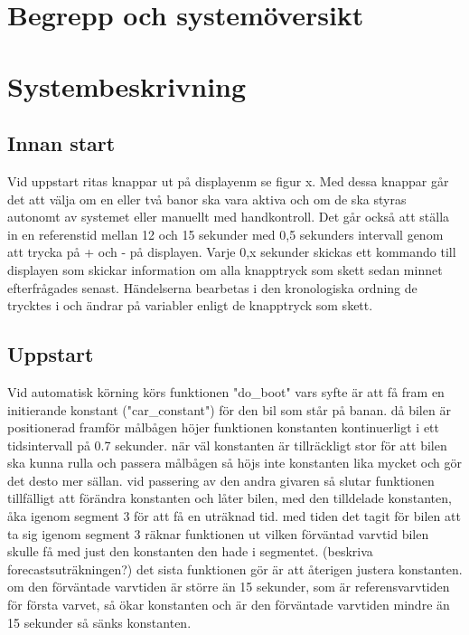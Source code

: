 \documentclass[10pt,oneside,swedish]{lips-no_customer}
\begin{document}
\section{Begrepp och systemöversikt}
\section{Systembeskrivning}

\subsection{Innan start}

Vid uppstart ritas knappar ut på displayenm se figur x. Med dessa knappar går
det att välja om en eller två banor ska vara aktiva och om de ska styras
autonomt av systemet eller manuellt med handkontroll. Det går också att ställa
in en referenstid mellan 12 och 15 sekunder med 0,5 sekunders intervall genom
att trycka på + och - på displayen. Varje 0,x sekunder skickas ett kommando till
displayen som skickar information om alla knapptryck som skett sedan minnet
efterfrågades senast. Händelserna bearbetas i den kronologiska ordning de
trycktes i och ändrar på variabler enligt de knapptryck som skett.

\subsection{Uppstart} 

Vid automatisk körning körs funktionen "do\_boot" vars syfte är att få fram en
initierande konstant ("car\_constant") för den bil som står på banan. då bilen är
positionerad framför målbågen höjer funktionen konstanten kontinuerligt i ett
tidsintervall på 0.7 sekunder. när väl konstanten är tillräckligt stor för att
bilen ska kunna rulla och passera målbågen så höjs inte konstanten lika mycket
och gör det desto mer sällan. vid passering av den andra givaren så slutar
funktionen tillfälligt att förändra konstanten och låter bilen, med den
tilldelade konstanten, åka igenom segment 3 för att få en uträknad tid. med
tiden det tagit för bilen att ta sig igenom segment 3 räknar funktionen ut
vilken förväntad varvtid bilen skulle få med just den konstanten den hade i
segmentet.  (beskriva forecastsuträkningen?) det sista funktionen gör är att
återigen justera konstanten. om den förväntade varvtiden är större än 15
sekunder, som är referensvarvtiden för första varvet, så ökar konstanten och är
den förväntade varvtiden mindre än 15 sekunder så sänks konstanten. 
\end{document}
